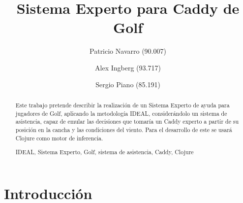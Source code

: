 \documentclass[runningheads,a4paper]{llncs}
\newcommand{\keywords}[1]{\par\addvspace\baselineskip
\noindent\keywordname\enspace\ignorespaces#1}
\begin{document}
\mainmatter  %

\title{Sistema Experto para Caddy de Golf}


%
%
\author{Patricio Navarro (90.007)\and Alex Ingberg (93.717)\and Sergio Piano (85.191)}
%


%
%

\maketitle


\begin{abstract}
Este trabajo pretende describir la realización de un Sistema Experto de ayuda para jugadores de Golf, aplicando la metodología IDEAL, considerándolo un sistema de asistencia, capaz de emular las decisiones que tomaría un Caddy experto a partir de su posición en la cancha  y las condiciones del viento. Para el desarrollo de este se usará Clojure como motor de inferencia.
\keywords{IDEAL, Sistema Experto, Golf, sistema de asistencia, Caddy, Clojure}
\end{abstract}


\section{Introducción}
\end{document}
